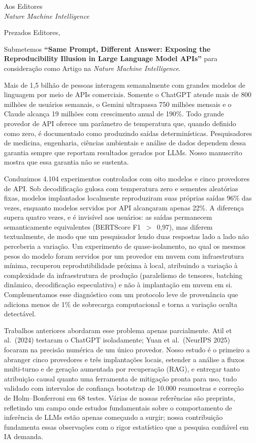 \documentclass[11pt]{letter}
\begin{document}
\begin{letter}{Aos Editores\\
\textit{Nature Machine Intelligence}}

\opening{Prezados Editores,}

Submetemos \textbf{``Same Prompt, Different Answer: Exposing the Reproducibility Illusion in Large Language Model APIs''} para considera\c{c}\~ao como Artigo na \textit{Nature Machine Intelligence}.

Mais de 1,5 bilh\~ao de pessoas interagem semanalmente com grandes modelos de linguagem por meio de APIs comerciais. Somente o ChatGPT atende mais de 800 milh\~oes de usu\'arios semanais, o Gemini ultrapassa 750 milh\~oes mensais e o Claude alcan\c{c}a 19 milh\~oes com crescimento anual de 190\%. Todo grande provedor de API oferece um par\^ametro de temperatura que, quando definido como zero, \'e documentado como produzindo sa\'idas determin\'isticas. Pesquisadores de medicina, engenharia, ci\^encias ambientais e an\'alise de dados dependem dessa garantia sempre que reportam resultados gerados por LLMs. Nosso manuscrito mostra que essa garantia n\~ao se sustenta.

Conduzimos 4.104 experimentos controlados com oito modelos e cinco provedores de API. Sob decodifica\c{c}\~ao gulosa com temperatura zero e sementes aleat\'orias fixas, modelos implantados localmente reproduziram suas pr\'oprias sa\'idas 96\% das vezes, enquanto modelos servidos por API alcan\c{c}aram apenas 22\%. A diferen\c{c}a supera quatro vezes, e \'e invis\'ivel aos usu\'arios: as sa\'idas permanecem semanticamente equivalentes (BERTScore F1~$>$~0,97), mas diferem textualmente, de modo que um pesquisador lendo duas respostas lado a lado n\~ao perceberia a varia\c{c}\~ao. Um experimento de quase-isolamento, no qual os mesmos pesos do modelo foram servidos por um provedor em nuvem com infraestrutura m\'inima, recuperou reprodutibilidade pr\'oxima \`a local, atribuindo a varia\c{c}\~ao \`a complexidade da infraestrutura de produ\c{c}\~ao (paralelismo de tensores, batching din\^amico, decodifica\c{c}\~ao especulativa) e n\~ao \`a implanta\c{c}\~ao em nuvem em si. Complementamos esse diagn\'ostico com um protocolo leve de proven\^ancia que adiciona menos de 1\% de sobrecarga computacional e torna a varia\c{c}\~ao oculta detect\'avel.

Trabalhos anteriores abordaram esse problema apenas parcialmente. Atil et al.\ (2024) testaram o ChatGPT isoladamente; Yuan et al.\ (NeurIPS 2025) focaram na precis\~ao num\'erica de um \'unico provedor. Nosso estudo \'e o primeiro a abranger cinco provedores e tr\^es implanta\c{c}\~oes locais, estender a an\'alise a fluxos multi-turno e de gera\c{c}\~ao aumentada por recupera\c{c}\~ao (RAG), e entregar tanto atribui\c{c}\~ao causal quanto uma ferramenta de mitiga\c{c}\~ao pronta para uso, tudo validado com intervalos de confian\c{c}a bootstrap de 10.000 reamostras e corre\c{c}\~ao de Holm--Bonferroni em 68 testes. V\'arias de nossas refer\^encias s\~ao preprints, refletindo um campo onde estudos fundamentais sobre o comportamento de infer\^encia de LLMs est\~ao apenas come\c{c}ando a surgir; nossa contribui\c{c}\~ao fundamenta essas observa\c{c}\~oes com o rigor estat\'istico que a pesquisa confi\'avel em IA demanda.


\end{letter}
\end{document}
